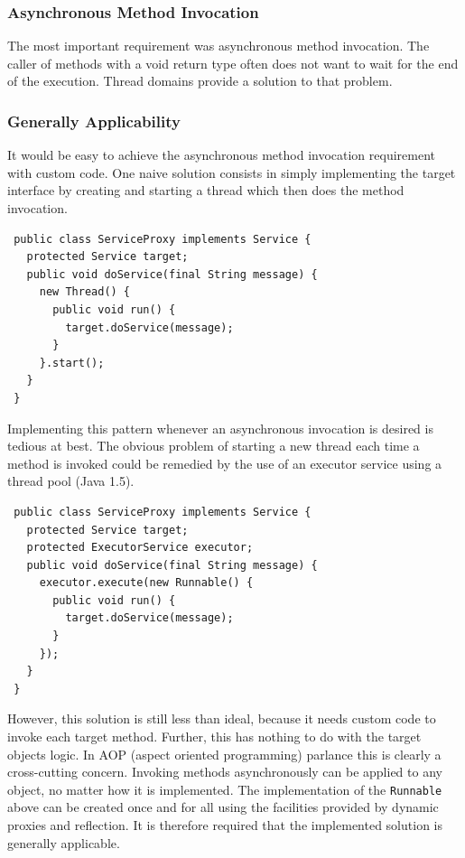 \subsubsection{Asynchronous Method Invocation}
The most important requirement was asynchronous method invocation. 
The caller of methods with a void return type often does not want to wait
for the end of the execution. Thread domains provide a solution to that
problem.


\subsubsection{Generally Applicability}
It would be easy to achieve the asynchronous method invocation requirement
with custom code. One naive solution consists in simply implementing the target
interface by creating and starting a thread which then does the method
invocation.

\small{\begin{verbatim}
 public class ServiceProxy implements Service {
   protected Service target;
   public void doService(final String message) {
     new Thread() {
       public void run() {
         target.doService(message);
       }
     }.start();
   }
 }
\end{verbatim}}

Implementing this pattern whenever an asynchronous invocation is desired
is tedious at best. The obvious problem of starting a new thread
each time a method is invoked could be remedied by the use of an
executor service using a thread pool (Java 1.5).

\small{\begin{verbatim}
 public class ServiceProxy implements Service {
   protected Service target;
   protected ExecutorService executor;
   public void doService(final String message) {
     executor.execute(new Runnable() {
       public void run() {
         target.doService(message);
       }
     });
   }
 }
\end{verbatim}}

However, this solution is still less than ideal, because it needs custom code
to invoke each target method. Further, this has nothing to do with the
target objects logic. In AOP (aspect oriented programming) parlance this
is clearly a cross-cutting concern. Invoking methods asynchronously can 
be applied to any object, no matter how it is implemented. The implementation
of the \texttt{Runnable} above can be created once and for all using the
facilities provided by dynamic proxies and reflection. It is therefore
required that the implemented solution is generally applicable.

